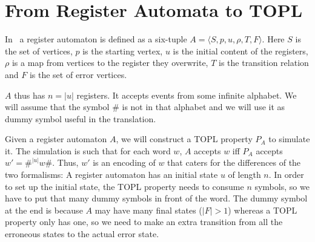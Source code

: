\section{From Register Automata to TOPL}\label{sec:ra-topl}
In~\cite{dblp:journals/tcs/kaminskif94} a register automaton is
defined as a six-tuple $A = \langle S, p, u, \rho, T, F\rangle$. Here $S$
is the set of vertices, $p$ is the starting vertex, $u$ is the initial
content of the registers, $\rho$ is a map from vertices to the
register they overwrite, $T$ is the transition relation and $F$ is the
set of error vertices.

$A$ thus has $n = |u|$ registers. It accepts events from some infinite
alphabet. We will assume that the symbol $\#$ is not in that alphabet and we will use it as dummy symbol useful in the translation.

Given a register automaton $A$, we will construct a TOPL property $P_A$ to simulate it. The
simulation is such that for each word $w$, $A$ accepts $w$ iff $P_A$
accepts $w' = \#^{|u|}w\#$. Thus, $w'$ is an encoding of $w$ that
caters for the differences of the two formalisms: A register automaton has an
initial state $u$ of length $n$. In order to set up the initial
state, the TOPL property needs to consume $n$ symbols, so we have to
put that many dummy symbols in front of the word. The dummy symbol at
the end is because $A$ may have many final states ($|F| > 1$) whereas a TOPL
property only has one, so we need to make an extra transition from all
the erroneous states to the actual error state.

